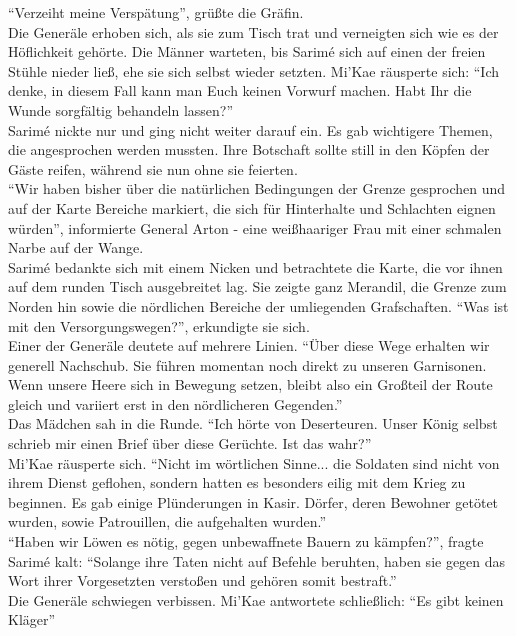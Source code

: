 ``Verzeiht meine Verspätung'', grüßte die Gräfin.\\
Die Generäle erhoben sich, als sie zum Tisch trat und verneigten sich wie es der Höflichkeit 
gehörte. Die Männer warteten, bis Sarimé sich auf einen der freien Stühle nieder ließ, ehe sie sich 
selbst wieder setzten. Mi'Kae räusperte sich: ``Ich denke, in diesem Fall kann man Euch keinen 
Vorwurf machen. Habt Ihr die Wunde sorgfältig behandeln lassen?''\\
Sarimé nickte nur und ging nicht weiter darauf ein. Es gab wichtigere Themen, die angesprochen 
werden mussten. Ihre Botschaft sollte still in den Köpfen der Gäste reifen, während sie nun ohne 
sie feierten.\\
``Wir haben bisher über die natürlichen Bedingungen der Grenze gesprochen und auf der Karte 
Bereiche markiert, die sich für Hinterhalte und Schlachten eignen würden'', informierte General 
Arton - eine weißhaariger Frau mit einer schmalen Narbe auf der Wange.\\
Sarimé bedankte sich mit einem Nicken und betrachtete die Karte, die vor ihnen auf dem runden Tisch 
ausgebreitet lag. Sie zeigte ganz Merandil, die Grenze zum Norden hin sowie die nördlichen Bereiche 
der umliegenden Grafschaften. ``Was ist mit den Versorgungswegen?'', erkundigte sie sich.\\
Einer der Generäle deutete auf mehrere Linien. ``Über diese Wege erhalten wir generell Nachschub. 
Sie führen momentan noch direkt zu unseren Garnisonen. Wenn unsere Heere sich in Bewegung setzen, 
bleibt also ein Großteil der Route gleich und variiert erst in den nördlicheren Gegenden.''\\
Das Mädchen sah in die Runde. ``Ich hörte von Deserteuren. Unser König selbst schrieb mir einen
Brief über diese Gerüchte. Ist das wahr?''\\
Mi'Kae räusperte sich. ``Nicht im wörtlichen Sinne... die Soldaten sind nicht von ihrem Dienst 
geflohen, sondern hatten es besonders eilig mit dem Krieg zu beginnen. Es gab einige Plünderungen 
in Kasir. Dörfer, deren Bewohner getötet wurden, sowie Patrouillen, die aufgehalten wurden.''\\
``Haben wir Löwen es nötig, gegen unbewaffnete Bauern zu kämpfen?'', fragte Sarimé kalt: ``Solange 
ihre Taten nicht auf Befehle beruhten, haben sie gegen das Wort ihrer Vorgesetzten verstoßen und 
gehören somit bestraft.''\\
Die Generäle schwiegen verbissen. Mi'Kae antwortete schließlich: ``Es gibt keinen Kläger''\\
